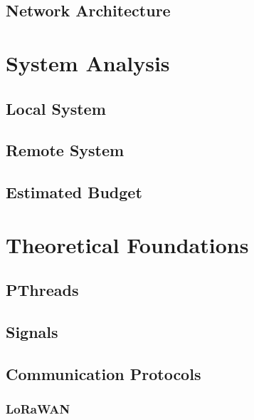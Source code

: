 \documentclass[12pt, letterpaper]{report}
\begin{document}
\section{Network Architecture}


\clearpage


\chapter{System Analysis}

\section{Local System}


\clearpage
\section{Remote System}


\clearpage
\section{Estimated Budget}


\clearpage


\chapter{Theoretical Foundations}
\section{PThreads}
\section{Signals}

\section{Communication Protocols}
\subsection{LoRaWAN}
\end{document}
